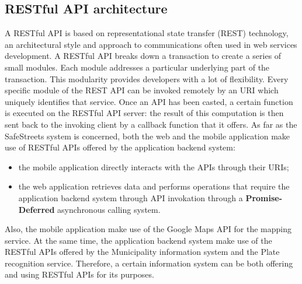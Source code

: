 \subsection{RESTful	API architecture}
A RESTful API is based on representational state transfer (REST) technology, an architectural style and approach to communications often used in web services development.
A RESTful API breaks down a transaction to create a series of small modules. Each module addresses a particular underlying part of the transaction. This modularity provides developers with a lot of flexibility. Every specific module of the REST API can be invoked remotely by an URI which uniquely identifies that service. Once an API has been casted, a certain function is executed on the RESTful API server: the result of this computation is then sent back to the invoking client by a callback function that it offers.
As far as the SafeStreets system is concerned, both the web and the mobile application make use of RESTful APIs offered by the application backend system: 
\begin{itemize}
    \item the mobile application directly interacts with the APIs through their URIs;
    \item the web application retrieves data and performs operations that require the application backend system through API invokation through a \textbf{Promise-Deferred} asynchronous calling system.
\end{itemize}
Also, the mobile application make use of the Google Maps API for the mapping service.\newline
At the same time, the application backend system make use of the RESTful APIs offered by the Municipality information system and the Plate recognition service.
Therefore, a certain information system can be both offering and using RESTful APIs for its purposes.
